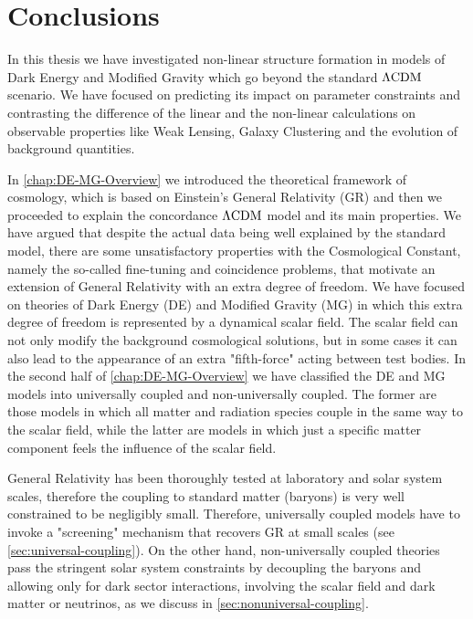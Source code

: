 \chapter*{Conclusions \label{Conclu}} %






In this thesis we have investigated non-linear structure formation in models of Dark Energy and Modified 
Gravity which go beyond the standard $\Lambda\mathrm{CDM}$ scenario. We have focused on predicting its impact
on parameter constraints and contrasting the difference of the linear and the non-linear calculations on observable properties like Weak Lensing, Galaxy Clustering and the evolution of background quantities.

In \cref{chap:DE-MG-Overview} we introduced the theoretical framework of cosmology, which is
based on Einstein's General Relativity (GR) and then we proceeded to explain the concordance $\Lambda\mathrm{CDM}$
model and its main properties. 
We have argued that despite the actual data being well explained by the standard model, 
there are some unsatisfactory properties with the Cosmological Constant, namely the so-called fine-tuning
and coincidence problems, that motivate an extension of General Relativity with an extra degree of freedom.
We have focused on theories of Dark Energy (DE) and Modified Gravity (MG) in which this extra degree of freedom  is represented by a dynamical scalar field. The scalar field can not 
only modify the background cosmological solutions,
but in some cases it can also lead to the appearance of an extra "fifth-force" acting between test bodies.
In the second half of \cref{chap:DE-MG-Overview} we have classified the DE and MG models into universally coupled  and non-universally coupled. The former are those models in which all matter and radiation species couple
in the same way to the scalar field, while the latter are models in which just a specific matter component feels the influence of the scalar field. 

General Relativity has been thoroughly tested at laboratory and solar system scales, therefore the coupling to standard matter (baryons) is very well constrained to be negligibly small.
Therefore, universally coupled models have to invoke a "screening" mechanism that recovers GR at small scales (see \cref{sec:universal-coupling}).
On the other hand, non-universally coupled theories pass the stringent solar system constraints by decoupling the baryons
and allowing only for dark sector interactions, involving the scalar field and dark matter or neutrinos, as we discuss in \cref{sec:nonuniversal-coupling}.

